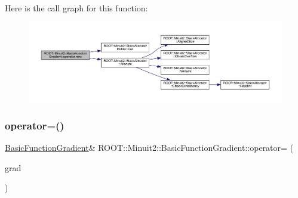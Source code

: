 Here is the call graph for this function\+:
\nopagebreak
\begin{figure}[H]
\begin{center}
\leavevmode
\includegraphics[width=350pt]{db/d85/classROOT_1_1Minuit2_1_1BasicFunctionGradient_a2b08ebb0074a43cfca91f74991c660d5_cgraph}
\end{center}
\end{figure}
\mbox{\label{classROOT_1_1Minuit2_1_1BasicFunctionGradient_a1bf2f76bab802466b8697136fbea33e4}} 
\subsubsection{\texorpdfstring{operator=()}{operator=()}\hspace{0.1cm}{\footnotesize\ttfamily [1/2]}}
{\footnotesize\ttfamily \mbox{\hyperlink{classROOT_1_1Minuit2_1_1BasicFunctionGradient}{Basic\+Function\+Gradient}}\& R\+O\+O\+T\+::\+Minuit2\+::\+Basic\+Function\+Gradient\+::operator= (\begin{DoxyParamCaption}\item[{const \mbox{\hyperlink{classROOT_1_1Minuit2_1_1BasicFunctionGradient}{Basic\+Function\+Gradient}} \&}]{grad }\end{DoxyParamCaption})\hspace{0.3cm}{\ttfamily [inline]}}

\mbox{\label{classROOT_1_1Minuit2_1_1BasicFunctionGradient_a1bf2f76bab802466b8697136fbea33e4}} 
